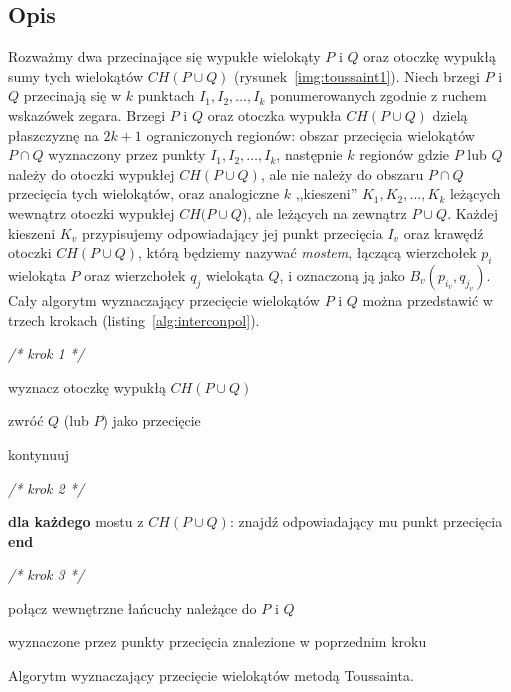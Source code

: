 \subsection{Opis}
Rozważmy dwa przecinające się wypukłe wielokąty $P$ i $Q$ oraz otoczkę
wypukłą sumy tych wielokątów $CH(P \cup Q)$
(rysunek~\ref{img:toussaint1}). Niech brzegi $P$ i $Q$ przecinają się
w $k$ punktach $I_1, I_2, \ldots, I_k$ ponumerowanych zgodnie z ruchem
wskazówek zegara. Brzegi $P$ i $Q$ oraz otoczka wypukła $CH(P \cup Q)$
dzielą płaszczyznę na $2k + 1$ ograniczonych regionów: obszar
przecięcia wielokątów $P \cap Q$ wyznaczony przez punkty $I_1, I_2,
\ldots, I_k$, następnie $k$ regionów gdzie $P$ lub $Q$ należy do
otoczki wypukłej $CH(P \cup Q)$, ale nie należy do obszaru $P \cap Q$
przecięcia tych wielokątów, oraz analogiczne $k$ ,,kieszeni'' $K_1,
K_2, \ldots, K_k$ leżących wewnątrz otoczki wypukłej $CH(P \cup Q$),
ale leżących na zewnątrz $P \cup Q$. Każdej kieszeni $K_v$
przypisujemy odpowiadający jej punkt przecięcia $I_v$ oraz krawędź
otoczki $CH(P \cup Q)$, którą będziemy nazywać \emph{mostem}, łączącą
wierzchołek $p_i$ wielokąta $P$ oraz wierzchołek $q_j$ wielokąta $Q$,
i oznaczoną ją jako $B_{v}(p_{i_v}, q_{j_v})$. Cały algorytm
wyznaczający przecięcie wielokątów $P$ i $Q$ można przedstawić w
trzech krokach (listing~\ref{alg:interconpol}).

\begin{algorithm}
  \begin{algorithmic}[1]

    \State \emph{/* krok 1 */}

    \State wyznacz otoczkę wypukłą $CH(P \cup Q)$

    \State

    \State zwróć $Q$ (lub $P$) jako przecięcie

    \Else
    \State kontynuuj
    \EndIf

    \State

    \State \emph{/* krok 2 */}

    \State \textbf{dla każdego} mostu z $CH(P \cup Q)$:
    \State \hspace{\algorithmicindent} znajdź odpowiadający mu punkt
    przecięcia
    \State \textbf{end}

    \State

    \State \emph{/* krok 3 */}

    \State połącz wewnętrzne łańcuchy należące do $P$ i $Q$

    wyznaczone przez punkty przecięcia znalezione w poprzednim kroku

    \EndProcedure
  \end{algorithmic}
  \caption{\label{alg:interconpol} Algorytm wyznaczający przecięcie
    wielokątów metodą Toussainta.}
\end{algorithm}


